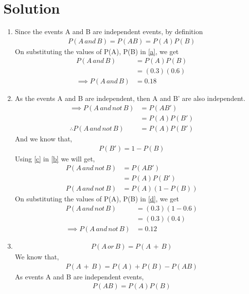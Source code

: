 \documentclass[journal,12pt,twocolumn]{IEEEtran}
\begin{document}
\section{Solution}
\begin{enumerate}[label={\roman*)}]
\item
Since the events A and B are independent events, by definition
\begin{align}
    P(A\, and\, B) = P(AB)= P(A)P(B)\label{a}
\end{align}
On substituting the values of P(A), P(B) in \eqref{a}, we get
\begin{align}
    P(A\, and\, B) &= P(A)P(B)\\
    &= (0.3)(0.6)\\
    \implies P(A\, and\, B)&=0.18
\end{align}
\item
As the events A and B are independent, then A and B' are also independent.
\begin{align}   
\implies P(A\, and\,not\, B) &=P(AB')\\
&= P(A)P(B')\\
\therefore P(A\, and\,not\, B) &= P(A)P(B')\label{b}
\end{align}
And we know that,
\begin{align}
    P(B')=1-P(B)\label{c}
\end{align}
Using \eqref{c} in \eqref{b} we will get,
\begin{align}
    P(A\, and\,not\, B) &=P(AB') \\
    &= P(A)P(B')\\
    P(A\, and\,not\, B)&= P(A)(1-P(B))\label{d}
\end{align}
On substituting the values of P(A), P(B) in \eqref{d}, we get
\begin{align}
    P(A\, and\, not\, B) &= (0.3)(1-0.6)\\
    &= (0.3)(0.4)\\
    \implies P(A\, and\, not\, B)&= 0.12
\end{align}
\item
\begin{align}
    P(A\,or\,B) =P(A\,+\,B)\label{e}
\end{align}
We know that,
\begin{align}
    P(A\, +\, B) = P(A) + P(B) -P(AB)\label{f}
\end{align}
As events A and B are independent events,
\begin{align}
    P(AB)=P(A)P(B)\label{g}
\end{align}

\end{enumerate}
\end{document}
